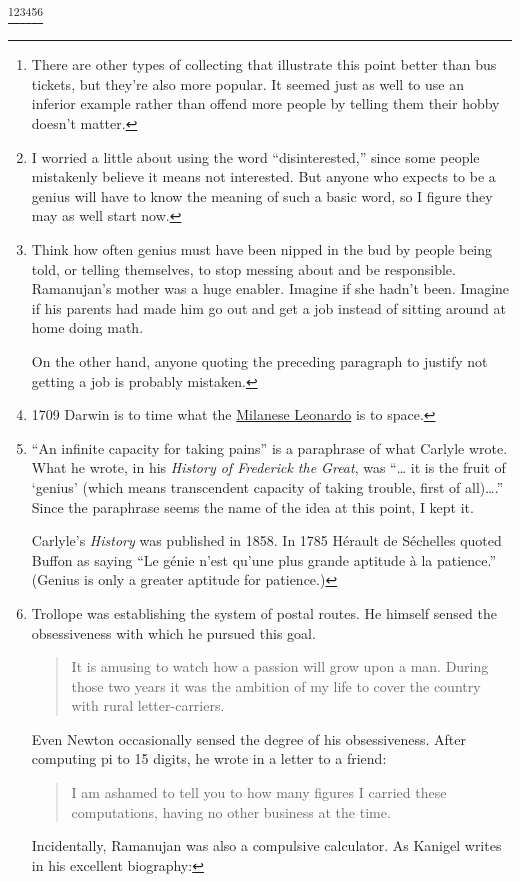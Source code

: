 \footnote{There are other types of collecting that illustrate this point
better than bus tickets, but they're also more popular. It seemed just
as well to use an inferior example rather than offend more people by
telling them their hobby doesn't matter.}\footnote{I worried a little about using the word ``disinterested,'' since
some people mistakenly believe it means not interested. But anyone who
expects to be a genius will have to know the meaning of such a basic
word, so I figure they may as well start now.}\footnote{Think how often genius must have been nipped in the bud by
people being told, or telling themselves, to stop messing about and be
responsible. Ramanujan's mother was a huge enabler. Imagine if she
hadn't been. Imagine if his parents had made him go out and get a job
instead of sitting around at home doing math.

On the other hand, anyone quoting the preceding paragraph to justify not
getting a job is probably mistaken.}\footnote{1709 Darwin is to time what the \href{cities.html}{Milanese
Leonardo} is to space.}\footnote{``An infinite capacity for taking pains'' is a paraphrase of
what Carlyle wrote. What he wrote, in his \emph{History of Frederick the
Great}, was ``\ldots{} it is the fruit of `genius' (which means
transcendent capacity of taking trouble, first of all)\ldots.'' Since
the paraphrase seems the name of the idea at this point, I kept it.

Carlyle's \emph{History} was published in 1858. In 1785 Hérault de
Séchelles quoted Buffon as saying ``Le génie n'est qu'une plus grande
aptitude à la patience.'' (Genius is only a greater aptitude for
patience.)}\footnote{Trollope was establishing the system of postal routes. He
himself sensed the obsessiveness with which he pursued this goal.

\begin{quote}
It is amusing to watch how a passion will grow upon a man. During those
two years it was the ambition of my life to cover the country with rural
letter-carriers.
\end{quote}

Even Newton occasionally sensed the degree of his obsessiveness. After
computing pi to 15 digits, he wrote in a letter to a friend:

\begin{quote}
I am ashamed to tell you to how many figures I carried these
computations, having no other business at the time.
\end{quote}

Incidentally, Ramanujan was also a compulsive calculator. As Kanigel
writes in his excellent biography:

}
